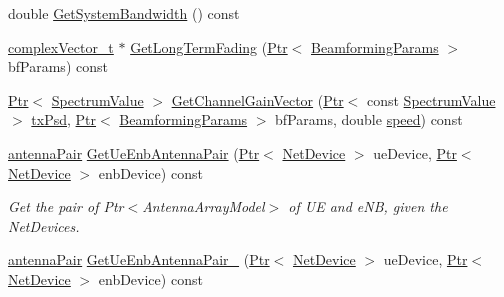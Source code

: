 \begin{DoxyCompactItemize}
double \hyperlink{classns3_1_1MmWaveBeamforming_a5dda4b699d52f4899e145b8dcd23d951}{Get\+System\+Bandwidth} () const 
\item 
\hyperlink{namespacens3_a6a7f75817ae50e6ac47414955b17d926}{complex\+Vector\+\_\+t} $\ast$ \hyperlink{classns3_1_1MmWaveBeamforming_aaebee646eb65674e6a52053dca949019}{Get\+Long\+Term\+Fading} (\hyperlink{classns3_1_1Ptr}{Ptr}$<$ \hyperlink{structns3_1_1BeamformingParams}{Beamforming\+Params} $>$ bf\+Params) const 
\item 
\hyperlink{classns3_1_1Ptr}{Ptr}$<$ \hyperlink{classns3_1_1SpectrumValue}{Spectrum\+Value} $>$ \hyperlink{classns3_1_1MmWaveBeamforming_a874dc6be592a7e9665bf855990f6f1b4}{Get\+Channel\+Gain\+Vector} (\hyperlink{classns3_1_1Ptr}{Ptr}$<$ const \hyperlink{classns3_1_1SpectrumValue}{Spectrum\+Value} $>$ \hyperlink{lte__link__budget__x2__handover__measures_8m_a684fe3101a5e48a5fcc57cab8dbcd1aa}{tx\+Psd}, \hyperlink{classns3_1_1Ptr}{Ptr}$<$ \hyperlink{structns3_1_1BeamformingParams}{Beamforming\+Params} $>$ bf\+Params, double \hyperlink{mmwave-amc-test_8cc_a6dc6e6f3c75c509ce943163afb5dade7}{speed}) const 
\item 
\hyperlink{namespacens3_aa7da494dc75bd8e5232a27429c48a195}{antenna\+Pair} \hyperlink{classns3_1_1MmWaveBeamforming_ac7cbf30e822589a92838ab709632389b}{Get\+Ue\+Enb\+Antenna\+Pair} (\hyperlink{classns3_1_1Ptr}{Ptr}$<$ \hyperlink{classns3_1_1NetDevice}{Net\+Device} $>$ ue\+Device, \hyperlink{classns3_1_1Ptr}{Ptr}$<$ \hyperlink{classns3_1_1NetDevice}{Net\+Device} $>$ enb\+Device) const 
\begin{DoxyCompactList}\small\item\em Get the pair of Ptr$<$\+Antenna\+Array\+Model$>$ of UE and e\+NB, given the Net\+Devices. \end{DoxyCompactList}\item 
\hyperlink{namespacens3_aa7da494dc75bd8e5232a27429c48a195}{antenna\+Pair} \hyperlink{classns3_1_1MmWaveBeamforming_ab8ccc7d4fd27045fd702ee287e7098cd}{Get\+Ue\+Enb\+Antenna\+Pair\+\_} (\hyperlink{classns3_1_1Ptr}{Ptr}$<$ \hyperlink{classns3_1_1NetDevice}{Net\+Device} $>$ ue\+Device, \hyperlink{classns3_1_1Ptr}{Ptr}$<$ \hyperlink{classns3_1_1NetDevice}{Net\+Device} $>$ enb\+Device) const 
\end{DoxyCompactItemize}
